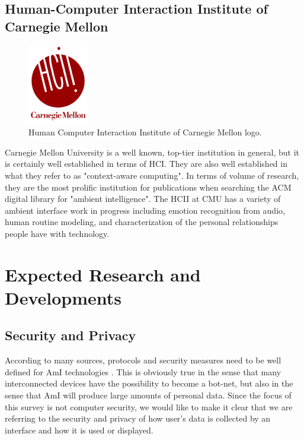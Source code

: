 \documentclass{article}
\begin{document}
\subsection{Human-Computer Interaction Institute of Carnegie Mellon}
\begin{figure}
  \begin{center}
    \includegraphics[width=.6\linewidth]{hcii}
  \end{center}
  \caption{Human Computer Interaction Institute of Carnegie Mellon logo. \cite{hciicmu}}
  \label{hcii}
\end{figure}
Carnegie Mellon University is a well known, top-tier institution in general, but it is certainly well established in terms of HCI. They are also well established in what they refer to as "context-aware computing". In terms of volume of research, they are the most prolific institution for publications when searching the ACM digital library for "ambient intelligence". The HCII at CMU has a variety of ambient interface work in progress including emotion recognition from audio, human routine modeling, and characterization of the personal relationships people have with technology. \cite{hciicmu}

%
%
\section{Expected Research and Developments}

%
\subsection{Security and Privacy}
According to many sources, protocols and security measures need to be well defined for AmI technologies \cite{Cook2009277} \cite{Sadri:2011:AIS:1978802.1978815}. This is obviously true in the sense that many interconnected devices have the possibility to become a bot-net, but also in the sense that AmI will produce large amounts of personal data. Since the focus of this survey is not computer security, we would like to make it clear that we are referring to the security and privacy of how user's data is collected by an interface and how it is used or displayed.
\end{document}
